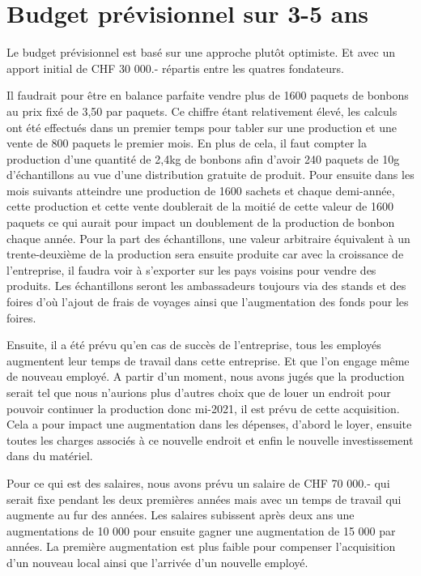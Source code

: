 \documentclass[12pt]{article}
\begin{document}
\section{Budget prévisionnel sur 3-5 ans}
Le budget prévisionnel est basé sur une approche plutôt optimiste.
Et avec un apport initial de CHF 30 000.- répartis entre les quatres fondateurs. 

Il faudrait pour être en balance parfaite vendre plus de 1600 paquets de bonbons au prix fixé de 3,50 par paquets. Ce chiffre étant relativement élevé, les calculs ont été effectués dans un premier temps pour tabler sur une production et une vente de 800 paquets le premier mois. En plus de cela, il faut compter la production d'une quantité de 2,4kg de bonbons afin d'avoir 240 paquets de 10g d'échantillons au vue d'une distribution gratuite de produit. Pour ensuite dans les mois suivants atteindre une production de 1600 sachets et chaque demi-année, cette production et cette vente doublerait de la moitié de cette valeur de 1600 paquets ce qui aurait pour impact un doublement de la production de bonbon chaque année. Pour la part des échantillons, une valeur arbitraire équivalent à un trente-deuxième de la production sera ensuite produite car avec la croissance de l'entreprise, il faudra voir à s'exporter sur les pays voisins pour vendre des produits. Les échantillons seront les ambassadeurs toujours via des stands et des foires d'où l'ajout de frais de voyages ainsi que l'augmentation des fonds pour les foires.

Ensuite, il a été prévu qu'en cas de succès de l'entreprise, tous les employés augmentent leur temps de travail dans cette entreprise. Et que l'on engage même de nouveau employé. A partir d'un moment, nous avons jugés que la production serait tel que nous n'aurions plus d'autres choix que de louer un endroit pour pouvoir continuer la production donc mi-2021, il est prévu de cette acquisition. Cela a pour impact une augmentation dans les dépenses, d'abord le loyer, ensuite toutes les charges associés à ce nouvelle endroit et enfin le nouvelle investissement dans du matériel.

Pour ce qui est des salaires, nous avons prévu un salaire de CHF 70 000.- qui serait fixe pendant les deux premières années mais avec un temps de travail qui augmente au fur des années. Les salaires subissent après deux ans une augmentations de 10 000 pour ensuite gagner une augmentation de 15 000 par années. La première augmentation est plus faible pour compenser l'acquisition d'un nouveau local ainsi que l'arrivée d'un nouvelle employé.
\end{document}
